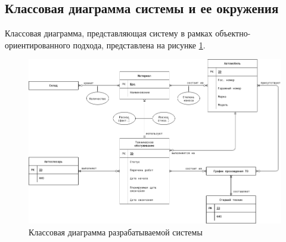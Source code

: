 \subsection{Классовая диаграмма системы и ее окружения}
Классовая диаграмма, представляющая систему в рамках объектно-ориентированного
подхода, представлена на рисунке \ref{fig:diag-er}.

\clearpage
\begin{landscape}

\begin{figure}[hp!]
\centering
\includegraphics[keepaspectratio,height=0.9\textheight]{./images/er-diagram.png}
\caption{Классовая диаграмма разрабатываемой системы}
\label{fig:diag-er}
\end{figure}

\end{landscape}
\clearpage
